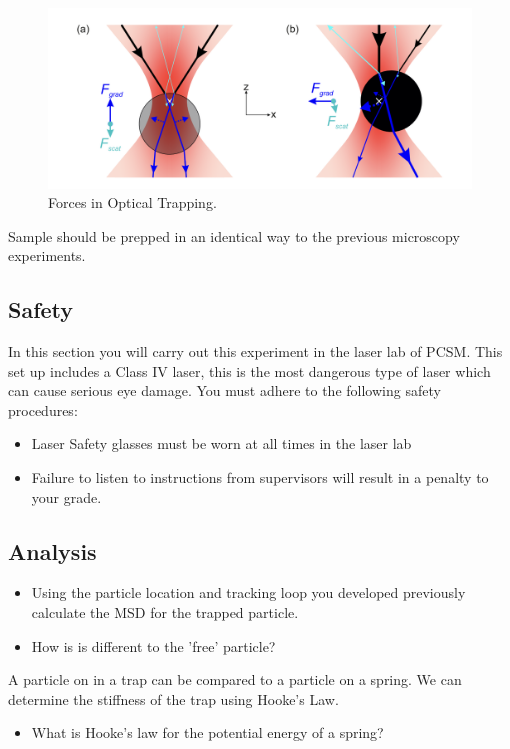 \documentclass[12pt,a4paper,twoside]{article}
\begin{document}
\begin{figure}
    \centering
    \includegraphics[width=1\linewidth]{Trapping.png}
    \caption{Forces in Optical Trapping.}
    \label{fig:trap}
\end{figure}

Sample should be prepped in an identical way to the previous microscopy experiments.

\subsection{Safety}
In this section you will carry out this experiment in the laser lab of PCSM. This set up includes a Class IV laser, this is the most dangerous type of laser which can cause serious eye damage. You must adhere to the following safety procedures:

\begin{itemize}
    \item Laser Safety glasses must be worn at all times in the laser lab
    \item Failure to listen to instructions from supervisors will result in a penalty to your grade.
\end{itemize}

\subsection{Analysis}
\begin{itemize}
	\item Using the particle location and tracking loop you developed previously calculate the MSD for the trapped particle. 
	\item How is is different to the 'free' particle?
	\vspace{2cm}
\end{itemize}

 A particle on in a trap can be compared to a particle on a spring. We can determine the stiffness of the trap using Hooke's Law.
 \begin{itemize}
	\item What is Hooke's law for the potential energy of a spring?
	\vspace{2cm}
\end{itemize}
	
\end{document}
